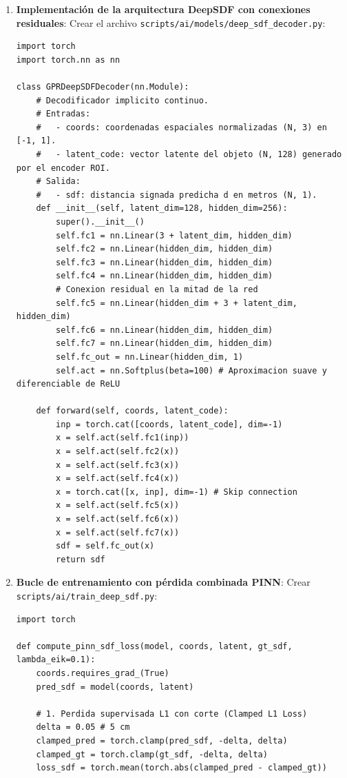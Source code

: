\documentclass[11pt,a4paper]{article}
\begin{document}
\begin{enumerate}
    \item \textbf{Implementaci{\'o}n de la arquitectura DeepSDF con conexiones residuales}:
    Crear el archivo \texttt{scripts/ai/models/deep\_sdf\_decoder.py}:
\begin{verbatim}
import torch
import torch.nn as nn

class GPRDeepSDFDecoder(nn.Module):
    # Decodificador implicito continuo.
    # Entradas:
    #   - coords: coordenadas espaciales normalizadas (N, 3) en [-1, 1].
    #   - latent_code: vector latente del objeto (N, 128) generado por el encoder ROI.
    # Salida:
    #   - sdf: distancia signada predicha d en metros (N, 1).
    def __init__(self, latent_dim=128, hidden_dim=256):
        super().__init__()
        self.fc1 = nn.Linear(3 + latent_dim, hidden_dim)
        self.fc2 = nn.Linear(hidden_dim, hidden_dim)
        self.fc3 = nn.Linear(hidden_dim, hidden_dim)
        self.fc4 = nn.Linear(hidden_dim, hidden_dim)
        # Conexion residual en la mitad de la red
        self.fc5 = nn.Linear(hidden_dim + 3 + latent_dim, hidden_dim)
        self.fc6 = nn.Linear(hidden_dim, hidden_dim)
        self.fc7 = nn.Linear(hidden_dim, hidden_dim)
        self.fc_out = nn.Linear(hidden_dim, 1)
        self.act = nn.Softplus(beta=100) # Aproximacion suave y diferenciable de ReLU

    def forward(self, coords, latent_code):
        inp = torch.cat([coords, latent_code], dim=-1)
        x = self.act(self.fc1(inp))
        x = self.act(self.fc2(x))
        x = self.act(self.fc3(x))
        x = self.act(self.fc4(x))
        x = torch.cat([x, inp], dim=-1) # Skip connection
        x = self.act(self.fc5(x))
        x = self.act(self.fc6(x))
        x = self.act(self.fc7(x))
        sdf = self.fc_out(x)
        return sdf
\end{verbatim}

    \item \textbf{Bucle de entrenamiento con p{\'e}rdida combinada PINN}:
    Crear \texttt{scripts/ai/train\_deep\_sdf.py}:
\begin{verbatim}
import torch

def compute_pinn_sdf_loss(model, coords, latent, gt_sdf, lambda_eik=0.1):
    coords.requires_grad_(True)
    pred_sdf = model(coords, latent)
    
    # 1. Perdida supervisada L1 con corte (Clamped L1 Loss)
    delta = 0.05 # 5 cm
    clamped_pred = torch.clamp(pred_sdf, -delta, delta)
    clamped_gt = torch.clamp(gt_sdf, -delta, delta)
    loss_sdf = torch.mean(torch.abs(clamped_pred - clamped_gt))
    

\end{verbatim}
\end{enumerate}
\end{document}
